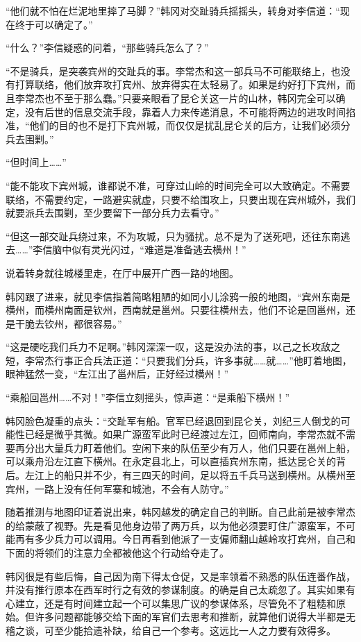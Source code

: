 “他们就不怕在烂泥地里摔了马脚？”韩冈对交趾骑兵摇摇头，转身对李信道：“现在终于可以确定了。”

“什么？”李信疑惑的问着，“那些骑兵怎么了？”

“不是骑兵，是突袭宾州的交趾兵的事。李常杰和这一部兵马不可能联络上，也没有打算联络，他们放弃攻打宾州、放弃得实在太轻易了。如果是约好打下宾州，而且李常杰也不至于那么蠢。”只要亲眼看了昆仑关这一片的山林，韩冈完全可以确定，没有后世的信息交流手段，靠着人力来传递消息，不可能将两边的进攻时间掐准，“他们的目的也不是打下宾州城，而仅仅是扰乱昆仑关的后方，让我们必须分兵去围剿。”

“但时间上……”

“能不能攻下宾州城，谁都说不准，可穿过山岭的时间完全可以大致确定。不需要联络，不需要约定，一路避实就虚，只要不给围攻上，只要出现在宾州城外，我们就要派兵去围剿，至少要留下一部分兵力去看守。”

“但这一部交趾兵绕过来，不为攻城，只为骚扰。总不是为了送死吧，还往东南逃去……”李信脑中似有灵光闪过，“难道是准备逃去横州！”

说着转身就往城楼里走，在厅中展开广西一路的地图。

韩冈跟了进来，就见李信指着简略粗陋的如同小儿涂鸦一般的地图，“宾州东南是横州，而横州南面是钦州，西南就是邕州。只要往横州去，他们不论是回邕州，还是干脆去钦州，都很容易。”

“这是硬吃我们兵力不足啊。”韩冈深深一叹，这是没办法的事，以己之长攻敌之短，李常杰行事正合兵法正道：“只要我们分兵，许多事就……就……”他盯着地图，眼神猛然一变，“左江出了邕州后，正好经过横州！”

“乘船回邕州……不对！”李信立刻摇头，惊声道：“是乘船下横州！”

韩冈脸色凝重的点头：“交趾军有船。官军已经退回到昆仑关，刘纪三人倒戈的可能性已经是微乎其微。如果广源蛮军此时已经渡过左江，回师南向，李常杰就不需要再分出大量兵力盯着他们。空闲下来的队伍至少有万人，他们只要在邕州上船，可以乘舟沿左江直下横州。在永定县北上，可以直插宾州东南，抵达昆仑关的背后。左江上的船只并不少，有三四天的时间，足以将五千兵马送到横州。从横州至宾州，一路上没有任何军寨和城池，不会有人防守。”

随着推测与地图印证着说出来，韩冈越发的确定自己的判断。自己此前是被李常杰的给蒙蔽了视野。先是看见他身边带了两万兵，以为他必须要盯住广源蛮军，不可能再有多少兵力可以调用。今日再看到他派了一支偏师翻山越岭攻打宾州，自己和下面的将领们的注意力全都被他这个行动给夺走了。

韩冈很是有些后悔，自己因为南下得太仓促，又是率领着不熟悉的队伍连番作战，并没有推行原本在西军时行之有效的参谋制度。的确是自己太疏忽了。其实如果有心建立，还是有时间建立起一个可以集思广议的参谋体系，尽管免不了粗糙和原始。但许多问题都能够交给下面的军官们去思考和推断，就算他们说得大半都是无稽之谈，可至少能拾遗补缺，给自己一个参考。这远比一人之力要有效得多。

